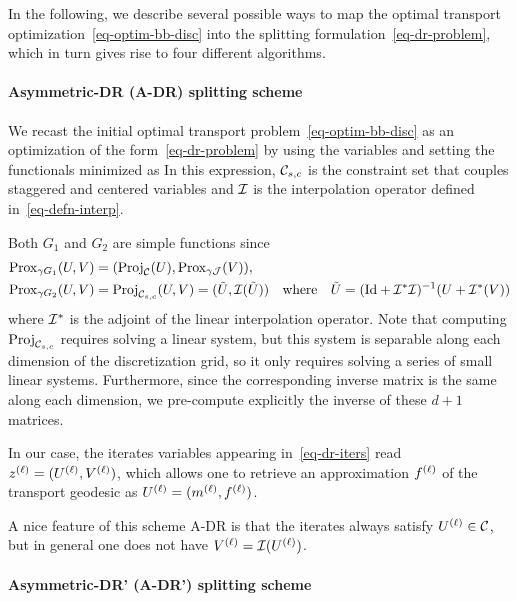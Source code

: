 In the following, we describe several possible ways to map the optimal transport optimization~\eqref{eq-optim-bb-disc} into the splitting formulation~\eqref{eq-dr-problem}, which in turn gives rise to four different algorithms.

\paragraph{Asymmetric-DR (A-DR) splitting scheme}

We recast the initial optimal transport problem~\eqref{eq-optim-bb-disc} as an optimization of the form~\eqref{eq-dr-problem} by using the variables 
and setting the functionals minimized as
In this expression, $\mathcal{C}_{s,c}$ is the constraint set that couples staggered and centered variables
and $\mathcal{I}$ is the interpolation operator defined in~\eqref{eq-defn-interp}.

Both $G_1$ and $G_2$ are simple functions since
\begin{align}\label{eq-def-dr-functionals}
	\prox_{\ga G_1}(U,V) &= ( \proj_{\Cinc}(U), \prox_{\ga \Jfunc}(V) ), \\
	\prox_{\ga G_2}(U,V) &= \proj_{\Cc_{s,c}}(U,V) = ( \tilde U, \Ii(\tilde U) )
	\qwhereq
	\tilde U = (\Id + \Ii^* \Ii)^{-1}( U + \Ii^*(V) )
\end{align}
where $\mathcal{I}^*$ is the adjoint of the linear interpolation operator. Note that computing $\operatorname{Proj}_{\mathcal{C}_{s,c}}$ requires solving a linear system, but this system is separable along each dimension of the discretization grid, so it only requires solving a series of small linear systems. Furthermore, since the corresponding inverse matrix is the same along each dimension, we pre-compute explicitly the inverse of these $d+1$ matrices.


In our case, the iterates variables appearing in~\eqref{eq-dr-iters} read ${z}^{(\ell)} = ({U}^{(\ell)}, {V}^{(\ell)})$, which allows one to retrieve an approximation ${f}^{(\ell)}$ of the transport geodesic as ${U}^{(\ell)} = ({m}^{(\ell)},{f}^{(\ell)})$.

A nice feature of this scheme A-DR is that the iterates always satisfy ${U}^{(\ell)} \in \mathcal{C}$, but in general one does not have ${V}^{(\ell)} = \mathcal{I}({U}^{(\ell)})$. 


\paragraph{Asymmetric-DR' (A-DR') splitting scheme}

